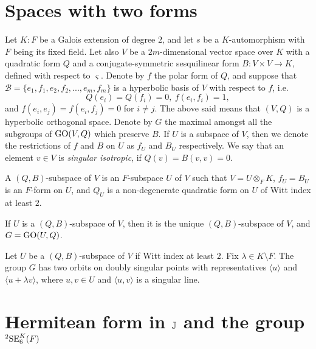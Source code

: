 
\section{Spaces with two forms}

Let $K : F$ be a Galois extension of degree $2$, 
and let $s$ be a $K$-automorphism
with $F$ being its fixed field. Let also $V$ be a $2m$-dimensional vector space over $K$ with 
a quadratic form $Q$ and a conjugate-symmetric sesquilinear form 
\mbox{$B : V\times V \rightarrow K$},
defined with respect to $\varsigma$. Denote by $f$ the polar form of $Q$, and suppose that 
\mbox{$\mathcal{B} = \{ e_1, f_1, e_2, f_2, ..., e_m, f_m \}$}
is a hyperbolic basis of $V$ with respect to $f$, i.e.
\begin{equation}
	Q(e_i) = Q(f_i) = 0,\ f(e_i, f_i) = 1,
\end{equation}
and $f(e_i,e_j) = f(e_i,f_j) = 0$ for $i \neq j$. The above said means that $(V,Q)$ is a hyperbolic
orthogonal space. Denote by $G$ the maximal amongst all the subgroups of 
$\mathrm{GO}(V, Q)$ which preserve $B$. If $U$ 
is a subspace of $V$, then we denote the restrictions of $f$ and $B$ on $U$ as $f_U$ and $B_U$ 
respectively. We say that an element $v \in V$ is \textit{singular isotropic}, if $Q(v) = B(v,v) = 0$. 

\begin{definition}
	A $(Q,B)$-subspace of $V$ is an $F$-subspace $U$ of $V$ such that \mbox{$V = U \otimes_F K$}, 
	$f_U = B_U$ is an $F$-form on $U$, and $Q_U$ is a non-degenerate quadratic form on $U$ of 
	Witt index at least $2$. 
\end{definition}

\begin{proposition}
	\label{prop:3_2forms}
	If $U$ is a $(Q,B)$-subspace of $V$, then it is the unique $(Q,B)$-subspace of $V$, and
	$G = \mathrm{GO}(U,Q)$. 
\end{proposition}

\begin{proposition}
	\label{prop:3_2forms_orbits}
	Let $U$ be a $(Q,B)$-subspace of $V$ if Witt index at least $2$. Fix $\lambda \in K 
	\setminus F$. The group $G$ has two orbits on doubly singular points with representatives
	$\langle u \rangle$ and $\langle u + \lambda v \rangle$, where $u,v \in U$ and 
	$\langle u, v \rangle$ 	is a singular line. 
\end{proposition}

\section{Hermitean form in $\mathbb{J}$ and the group ${}^2\mathrm{SE}_6^K(F)$}


